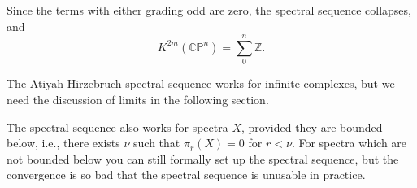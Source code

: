 \documentclass[../main]{subfiles}
\begin{document}
\begin{center}
\end{center}

Since the terms with either grading odd are zero, the spectral sequence collapses, and 
\begin{equation*}
    K^{2m}(\mathbb{CP}^n)=\sum_{0}^n\mathbb{Z}.
\end{equation*}

The Atiyah-Hirzebruch spectral sequence works for infinite complexes, but we need the discussion of limits in the following section.

The spectral sequence also works for spectra $X$, provided they are bounded below, i.e., there exists $\nu$ such that $\pi_r(X)=0$ for $r<\nu$. For spectra which are not bounded below you can still formally set up the spectral sequence, but the convergence is so bad that the spectral sequence is unusable in practice.
\end{document}

